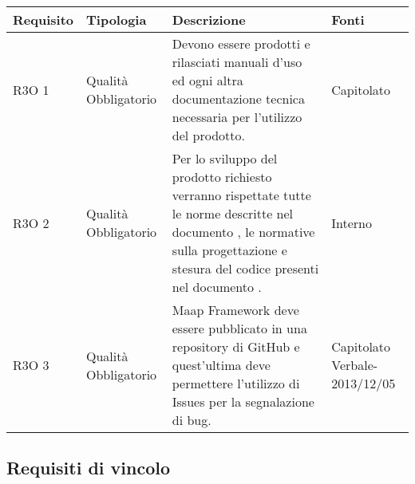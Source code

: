       \begin{center}
      \bgroup
      \def\arraystretch{1.8}
      \begin{longtable}{ | l | p{2cm} | p{5cm} | p{1.7cm} |}
    
      \cellcolor[gray]{0.9} \textbf{Requisito} & \cellcolor[gray]{0.9} \textbf{Tipologia} 
      & \cellcolor[gray]{0.9} \textbf{Descrizione} & \cellcolor[gray]{0.9} \textbf{Fonti} \\ \hline
      
        R3O 1 & Qualità \newline  Obbligatorio  & Devono essere prodotti e rilasciati manuali d'uso ed ogni altra documentazione tecnica necessaria per l’utilizzo del prodotto. &  Capitolato \newline  \\ \hline      
        R3O 2 & Qualità \newline  Obbligatorio  & Per lo sviluppo del prodotto richiesto verranno rispettate tutte le norme descritte nel documento \NormeDiProgetto{}, le normative sulla progettazione e stesura del codice presenti nel  documento \PianoDiQualifica{} . &  Interno \newline  \\ \hline      
        R3O 3 & Qualità \newline  Obbligatorio  & Maap Framework deve essere pubblicato in una repository di GitHub e quest'ultima deve permettere l'utilizzo di Issues per la segnalazione di bug. &  Capitolato \newline  Verbale-2013/12/05 \newline  \\ \hline
      \end{longtable}
      \egroup
      \end{center}  
\clearpage

\subsection{Requisiti di vincolo }

